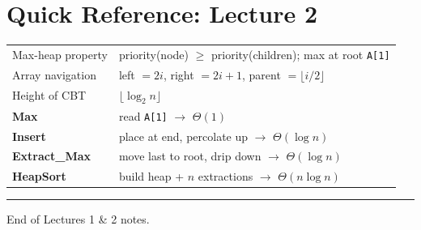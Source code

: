 \documentclass[11pt]{article}
\begin{document}
\section*{\textcolor{violetT}{Quick Reference: Lecture 2}}
\begin{keybox}
\renewcommand{\arraystretch}{1.35}
\begin{tabular}{l l}
Max-heap property & priority(node) $\ge$ priority(children); max at root \texttt{A[1]}\\
Array navigation & left $=2i$, \; right $=2i+1$, \; parent $=\lfloor i/2\rfloor$\\
Height of CBT & $\lfloor \log_2 n \rfloor$\\
\textbf{Max} & read \texttt{A[1]} $\to$ \textcolor{greenO}{$\Theta(1)$}\\
\textbf{Insert} & place at end, percolate up $\to$ \textcolor{violetT}{$\Theta(\log n)$}\\
\textbf{Extract\_Max} & move last to root, drip down $\to$ \textcolor{violetT}{$\Theta(\log n)$}\\
\textbf{HeapSort} & build heap + $n$ extractions $\to$ \textcolor{violetT}{$\Theta(n\log n)$}\\
\end{tabular}
\end{keybox}

\vspace{4pt}
\begin{center}\textcolor{greyline}{\rule{0.5\linewidth}{0.6pt}}\end{center}
\begin{center}\small\textcolor{greyline}{End of Lectures 1 \& 2 notes.}\end{center}


\newpage
 


%
%
%
%
\end{document}
